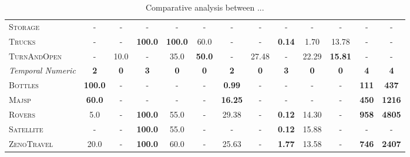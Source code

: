 \documentclass[11pt,landscape]{article}
\begin{document}
\begin{table*}[tb]
{\begin{tabular}{|l||ccccc||ccccc||c||c||}
\textsc{Storage}&-&-&-&-&-&-&-&-&-&-&-&-\\
\textsc{Trucks}&-&-&\textbf{100.0}&\textbf{100.0}&60.0&-&-&\textbf{0.14}&1.70&13.78&-&-\\
\textsc{TurnAndOpen}&-&10.0&-&35.0&\textbf{50.0}&-&27.48&-&22.29&\textbf{15.81}&-&-
\\\hline
\textit{Temporal Numeric}&\textbf{2}&\textbf{0}&\textbf{3}&\textbf{0}&\textbf{0}&\textbf{2}&\textbf{0}&\textbf{3}&\textbf{0}&\textbf{0}&\textbf{4}&\textbf{4}\\\hline
\textsc{Bottles}&\textbf{100.0}&-&-&-&-&\textbf{0.99}&-&-&-&-&\textbf{111}&\textbf{437}\\
\textsc{Majsp}&\textbf{60.0}&-&-&-&-&\textbf{16.25}&-&-&-&-&\textbf{450}&\textbf{1216}\\
\textsc{Rovers}&5.0&-&\textbf{100.0}&55.0&-&29.38&-&\textbf{0.12}&14.30&-&\textbf{958}&\textbf{4805}\\
\textsc{Satellite}&-&-&\textbf{100.0}&55.0&-&-&-&\textbf{0.12}&15.88&-&-&-\\
\textsc{ZenoTravel}&20.0&-&\textbf{100.0}&60.0&-&25.63&-&\textbf{1.77}&13.58&-&\textbf{746}&\textbf{2407}
\\\hline

        \end{tabular}}
        \caption{Comparative analysis between ...}
        \label{tab:experiments}
        \end{table*}
        
\end{document}
